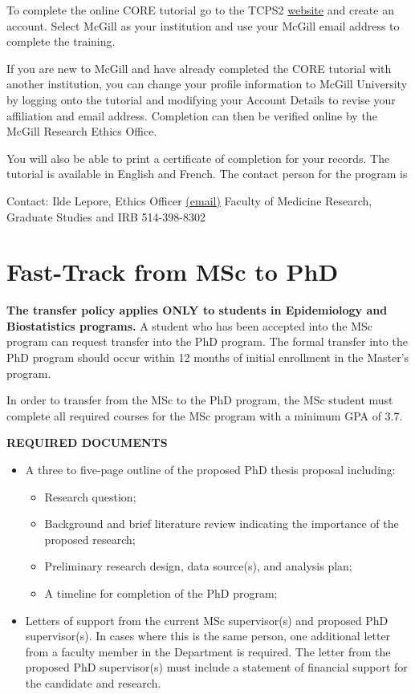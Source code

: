 \documentclass[
  openany]{book}
\providecommand{\tightlist}{%
  \setlength{\itemsep}{0pt}\setlength{\parskip}{0pt}}
\begin{document}
To complete the online CORE tutorial go to the TCPS2 \href{http://tcps2core.ca/welcome}{website} and create an account. Select McGill as your institution and use your McGill email address to complete the training.

If you are new to McGill and have already completed the CORE tutorial with another institution, you can change your profile information to McGill University by logging onto the tutorial and modifying your Account Details to revise your affiliation and email address. Completion can then be verified online by the McGill Research Ethics Office.

You will also be able to print a certificate of completion for your records. The tutorial is available in English and French. The contact person for the program is

Contact:
Ilde Lepore, Ethics Officer \href{mailto:ilde.lepore@mcgill.ca}{(email)}
Faculty of Medicine Research, Graduate Studies and IRB
514-398-8302

\hypertarget{fast-track-from-msc-to-phd}{%
\section{Fast-Track from MSc to PhD}\label{fast-track-from-msc-to-phd}}

\textbf{The transfer policy applies ONLY to students in Epidemiology and Biostatistics programs.} A student who has been accepted into the MSc program can request transfer into the PhD program. The formal transfer into the PhD program should occur within 12 months of initial enrollment in the Master's program.

In order to transfer from the MSc to the PhD program, the MSc student must complete all required courses for the MSc program with a minimum GPA of 3.7.

\textbf{REQUIRED DOCUMENTS}

\begin{itemize}
\tightlist
\item
  A three to five-page outline of the proposed PhD thesis proposal including:

  \begin{itemize}
  \tightlist
  \item
    Research question;
  \item
    Background and brief literature review indicating the importance of the proposed research;
  \item
    Preliminary research design, data source(s), and analysis plan;
  \item
    A timeline for completion of the PhD program;
  \end{itemize}
\item
  Letters of support from the current MSc supervisor(s) and proposed PhD supervisor(s). In cases where this is the same person, one additional letter from a faculty member in the Department is required. The letter from the proposed PhD supervisor(s) must include a statement of financial support for the candidate and research.
\end{itemize}
\end{document}
